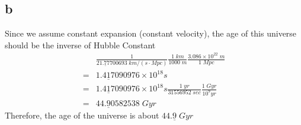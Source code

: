 \documentclass[11pt]{article}
\newcommand{\sci}[1]{\times 10^{#1}}
\begin{document}
\subsection*{b}
Since we assume constant expansion (constant velocity), the age of this universe should be the inverse of Hubble Constant
$$
\begin{aligned}
    &\frac{1}{21.\underline{7}7700693 \; km/(s \cdot Mpc)} \frac{1 \; km}{1000 \; m} \frac{3.086 \sci{22} \; m}{1 \; Mpc} \\
    = &1.4\underline{1}7090976 \sci{18} s\\
    = &1.4\underline{1}7090976 \sci{18} s \frac{1 \; yr}{31556952 \; sec} \frac{1 \; Gyr}{10^9 yr}\\
    = &44.\underline{9}0582538 \; Gyr
\end{aligned}
$$
Therefore, the age of the universe is about $44.\underline{9} \; Gyr$
\end{document}
